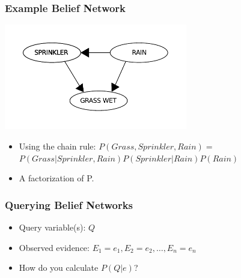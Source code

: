 \documentclass[12pt]{beamer} %
\begin{document}
\begin{frame}
\frametitle{Example Belief Network}
\begin{center}
\includegraphics[width=0.6\textwidth]{figures/uncert_fig_bayes-net.pdf}
\end{center}
\begin{itemize}
\item Using the chain rule:
$ P(Grass, Sprinkler, Rain) = $\\
                              $P(Grass | Sprinkler, Rain)P(Sprinkler | Rain)P(Rain)$
                              \item A factorization of P.
                              \end{itemize}

                              \end{frame}


                              \begin{frame}
                              \frametitle{Querying Belief Networks}
                              \begin{itemize}
                              \item Query variable(s): $Q$
                                                        \item Observed evidence: $E_1=e_1, E_2=e_2, \dots, E_n=e_n$
                                                        \item How do you calculate $P(Q|e)$?
                                                        \end{itemize}

                                                        \end{frame}
\end{document}
